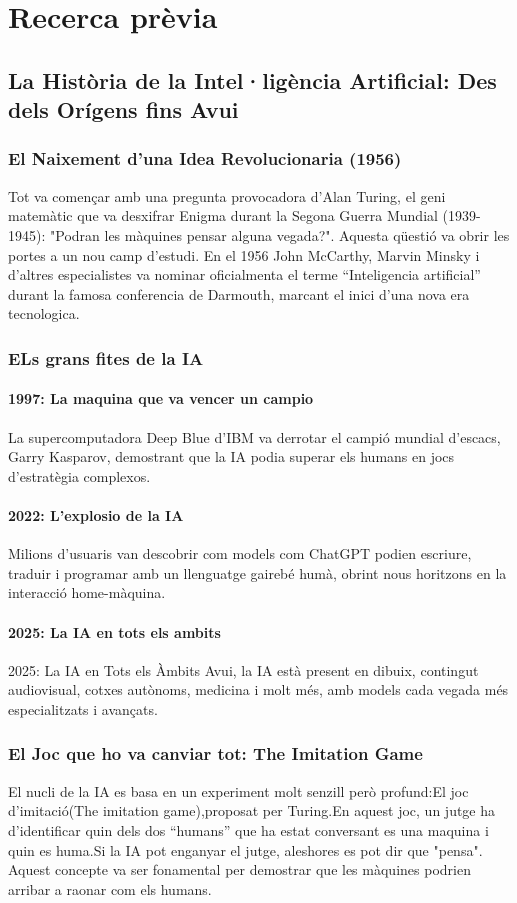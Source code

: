 \chapter{Recerca prèvia}
\label{c:intro}
\section{La Història de la Intel·ligència Artificial: Des dels Orígens fins Avui}
\subsection{El Naixement d'una Idea Revolucionaria (1956)}
Tot va començar amb una pregunta provocadora d’Alan Turing, el geni matemàtic que va desxifrar Enigma durant la Segona Guerra Mundial (1939-1945): "Podran les màquines pensar alguna vegada?". Aquesta qüestió va obrir les portes a un nou camp d’estudi. En el 1956 John McCarthy, Marvin Minsky i d'altres especialistes va nominar oficialmenta el terme ``Inteligencia artificial'' durant la famosa conferencia de Darmouth, marcant el inici d'una nova era tecnologica.
\subsection{ELs grans fites de la IA}
\subsubsection{1997: La maquina que va vencer un campio}
 La supercomputadora Deep Blue d’IBM va derrotar el campió mundial d’escacs, Garry Kasparov, demostrant que la IA podia superar els humans en jocs d’estratègia complexos.
\subsubsection{2022: L'explosio de la IA}
Milions d’usuaris van descobrir com models com ChatGPT podien escriure, traduir i programar amb un llenguatge gairebé humà, obrint nous horitzons en la interacció home-màquina.
\subsubsection{2025: La IA en tots els ambits}
    2025: La IA en Tots els Àmbits
    Avui, la IA està present en dibuix, contingut audiovisual, cotxes autònoms, medicina i molt més, amb models cada vegada més especialitzats i avançats.
\subsection{El Joc que ho va canviar tot: The Imitation Game}
El nucli de la IA es basa en un experiment molt senzill però profund:El joc d'imitació(The imitation game),proposat per Turing.En aquest joc, un jutge ha d’identificar quin dels dos ``humans'' que ha estat conversant es una maquina  i quin es huma.Si la IA pot enganyar el jutge, aleshores es pot dir que "pensa". Aquest concepte va ser fonamental per demostrar que les màquines podrien arribar a raonar com els humans.



